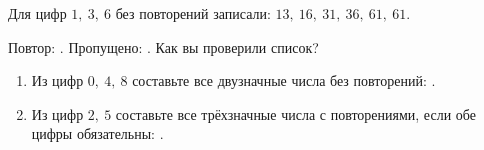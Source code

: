 \begin{warningbox}
  Для цифр \(1,\ 3,\ 6\) без повторений записали:
  \(13,\ 16,\ 31,\ 36,\ 61,\ 61\).

  Повтор: \answerblank[15mm]. Пропущено: \answerblank[15mm].
  Как вы проверили список?
\end{warningbox}

\begin{checkpointbox}
  \begin{enumerate}[label=\textbf{\arabic*.}]
    \item Из цифр \(0,\ 4,\ 8\) составьте все двузначные числа без повторений:
      \answerblank[70mm].
    \item Из цифр \(2,\ 5\) составьте все трёхзначные числа с повторениями,
      если обе цифры обязательны:
      \answerblank[88mm].
  \end{enumerate}
\end{checkpointbox}
